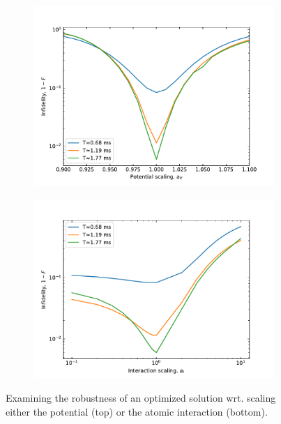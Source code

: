 \documentclass[a4paper, twocolumn]{revtex4-1}
\begin{document}
\begin{figure}
	\begin{subfigure}{\columnwidth}
		\centering
		\includegraphics[width=\columnwidth]{graphics/robustness/robustness.pdf}
	\end{subfigure}
	\begin{subfigure}{\columnwidth}
		\centering
		\includegraphics[width=\columnwidth]{graphics/robustness/interactionRobustness.pdf}
	\end{subfigure}
	\caption{Examining the robustness of an optimized solution wrt. scaling either the potential (top) or the atomic interaction (bottom).}
	\label{fig:robustness}
\end{figure}
\end{document}
